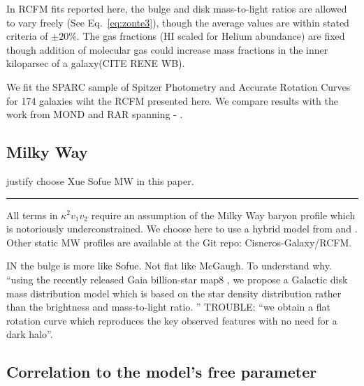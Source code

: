 \documentclass[reprint,%
 amsmath,amssymb,
 aps,
]{revtex4-1}
\begin{document}
In RCFM fits reported here, the    bulge and disk mass-to-light ratios are allowed to vary freely (See Eq.~\ref{eq:zonte3}), though the average values are within stated criteria   \cite{2016Lelli} of $\pm 20\%$. The gas fractions (HI scaled for Helium abundance) are fixed though addition of molecular gas could increase mass fractions in the inner kiloparsec of a galaxy(CITE RENE WB). 



 
 We fit the SPARC sample of Spitzer Photometry and Accurate Rotation Curves for 174 galaxies  \cite{2016Lelli} wiht the RCFM presented here. 
We compare results with the work from MOND and RAR spanning  \citet{McGaugh_2014}- \citet{Li_2018}. 
  
 
\subsection{Milky Way}
{\color{red}justify choose Xue Sofue   MW in this paper. }

{\color{red} \rule{\linewidth}{0.5mm}}

 All terms in $ \kappa^2 v_{1}v_{2}$ require an assumption of the Milky Way  baryon profile which is notoriously underconstrained. We choose here to use 
 a hybrid model from \cite{Xue} and \cite{Sofue}. Other static MW profiles are available at the Git repo: Cisneros-Galaxy/RCFM. 

IN \cite{Li2016ModellingMD} the bulge is more like Sofue. Not flat like McGaugh. 
To understand why. 
``using the recently released Gaia billion-star map8
, we propose a
Galactic disk mass distribution model which is based on the star density distribution
rather than the brightness and mass-to-light ratio. ''
TROUBLE: ``we obtain a flat rotation curve
which reproduces the key observed features with no need for a dark halo''.


 
\subsection{Correlation to  the model's free parameter }
 
\end{document}
